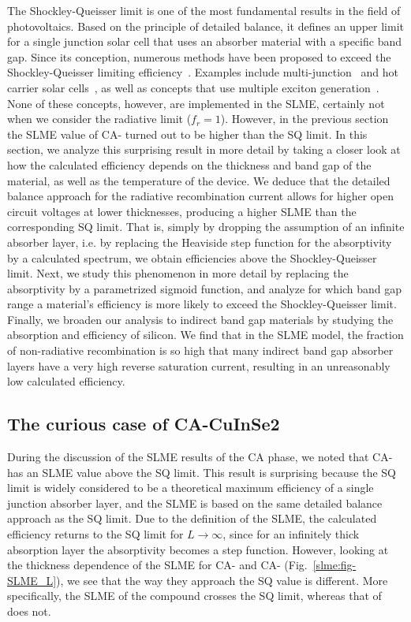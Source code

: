 \begin{refsection}
The Shockley-Queisser limit is one of the most fundamental results in the 
field of photovoltaics. Based on the principle of detailed balance, it defines 
an upper limit for a single junction solar cell that uses an absorber material 
with a specific band gap. Since its conception, numerous methods have been 
proposed to exceed the Shockley-Queisser limiting 
efficiency~\cite{Nelson2013}. Examples include multi-junction~\cite{Shah2004, 
Heremans2009} and hot carrier solar cells~\cite{Konig2010}, as well as 
concepts that use multiple exciton generation~\cite{Hanna2006}. None of these 
concepts, however, are implemented in the SLME, certainly not when we consider 
the radiative limit ($f_r = 1$). However, in the previous section the SLME 
value of CA- turned out to be higher than the SQ limit. In this 
section, we analyze this surprising result in more detail by taking a closer 
look at how the calculated efficiency depends on the thickness and band gap of 
the material, as well as the temperature of the device. We deduce that the 
detailed balance approach for the radiative recombination current allows for 
higher open circuit voltages at lower thicknesses, producing a higher SLME 
than the corresponding SQ limit. That is, simply by dropping the assumption of 
an infinite absorber layer, i.e. by replacing the Heaviside step function for 
the absorptivity by a calculated spectrum, we obtain efficiencies above the 
Shockley-Queisser limit. Next, we study this phenomenon in more detail by 
replacing the absorptivity by a parametrized sigmoid function, and analyze for 
which band gap range a material's efficiency is more likely to exceed the 
Shockley-Queisser limit. Finally, we broaden our analysis to indirect band gap 
materials by studying the absorption and efficiency of silicon. We find that 
in the SLME model, the fraction of non-radiative recombination is so high that 
many indirect band gap absorber layers have a very high reverse saturation 
current, resulting in an unreasonably low calculated efficiency.  
 
\subsection{The curious case of CA-CuInSe2} \label{slme:sec-CuInSe2} 
 
During the discussion of the SLME results of the CA phase, we noted that 
\mbox{CA-} has an SLME value above the SQ limit. This result is 
surprising because the SQ limit is widely considered to be a theoretical 
maximum efficiency of a single junction absorber layer, and the SLME is based 
on the same detailed balance approach as the SQ limit. Due to the definition 
of the SLME, the calculated efficiency returns to the SQ limit for \mbox{$L 
\rightarrow \infty$}, since for an infinitely thick absorption layer the 
absorptivity becomes a step function. However, looking at the thickness 
dependence of the SLME for \mbox{CA-} and \mbox{CA-} 
(Fig.~\ref{slme:fig-SLME_L}), we see that the way they approach the SQ value 
is different. More specifically, the SLME of the compound  crosses 
the SQ limit, whereas that of  does not. 
 

\end{refsection}
